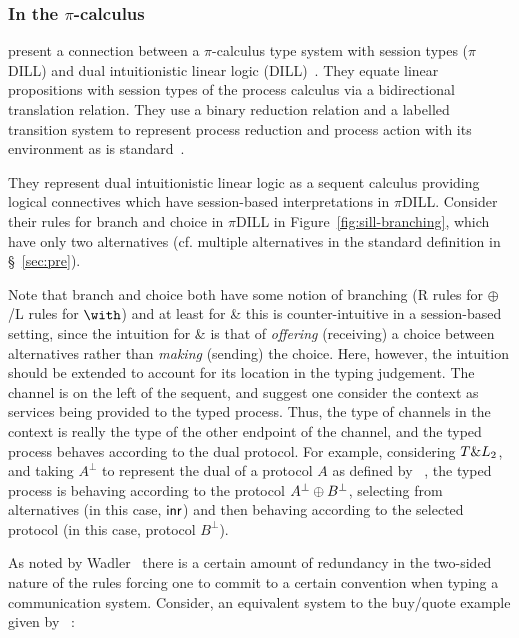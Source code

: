 \subsubsection{In the \texorpdfstring{$\pi$}{pi}-calculus}\label{sec:pis}

\citeauthor{Caires:2010:STI} \cite{Caires:2010:STI} present a connection
between a $\pi$-calculus type system with session types ($\pi$DILL) and dual
intuitionistic linear logic (DILL)~\cite{Barber:1996}. They equate linear
propositions with session types of the process calculus via a bidirectional
translation relation. They use a binary reduction relation and a labelled
transition system to represent process reduction and process action with its
environment as is standard~\cite{Sangiorgi:2001}.


They represent dual intuitionistic linear logic as a sequent calculus
providing logical connectives which have session-based interpretations in
$\pi$DILL. Consider their rules for branch and choice in $\pi$DILL in
Figure~\ref{fig:sill-branching}, which have only two alternatives
(cf. multiple alternatives in the standard definition in \S~\ref{sec:pre}).

Note that branch and choice both have some notion of branching (R rules for
$\oplus$/L rules for $\with$) and at least for \& this is counter-intuitive in
a session-based setting, since the intuition for \& is that of
\emph{offering} (receiving) a choice between alternatives rather than
\emph{making} (sending) the choice. Here, however, the intuition should be
extended to account for its location in the typing judgement. The channel is
on the left of the sequent, and \citeauthor{Caires:2010:STI} suggest one
consider the context as services being provided to the typed process. Thus,
the type of channels in the context is really the type of the other endpoint
of the channel, and the typed process behaves according to the dual
protocol. For example, considering $T \& L_2$, and taking $A^\bot$ to
represent the dual of a protocol $A$ as defined by
\citeauthor{Wadler:2014}~\cite{Wadler:2014}, the typed process is behaving
according to the protocol ${A^\bot}\oplus{B^\bot}$, selecting from
alternatives (in this case, $\mathsf{inr}$) and then behaving according to the
selected protocol (in this case, protocol $B^\bot$).

As noted by Wadler~\cite{Wadler:2014} there is a certain amount of redundancy
in the two-sided nature of the rules forcing one to commit to a certain
convention when typing a communication system. Consider, an equivalent system
to the buy/quote example given by
\citeauthor{Caires:2010:STI}~\cite[\S~3]{Caires:2010:STI}:


